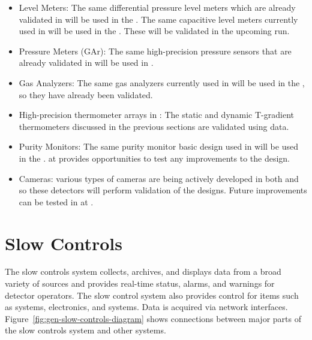 \begin{itemize}
	\item Level Meters: The same differential pressure level meters
	      which are already validated in  will be used in the . The same capacitive level meters currently used in
	       will be used in the . These will be
	      validated in the upcoming  run.
	      
	\item Pressure Meters (GAr): The same high-precision pressure sensors that are already validated in  will be used in  .
	
	\item Gas Analyzers: The same gas analyzers currently used in
	       will be used in the , so they have already
	      been validated.
	      
	\item High-precision thermometer arrays in : The static
	      and dynamic T-gradient thermometers discussed in the previous sections are validated using  data.
	      
	\item Purity Monitors: The same purity monitor basic design used in  will be used in the .  at  provides opportunities to
	      test any improvements to the design.
	\item Cameras: various types of cameras are being actively
	      developed in both  and  so these detectors will perform validation of the 
	      designs. Future
	      improvements can be tested in  at . %
\end{itemize}


\section{Slow Controls}

The slow controls system collects, archives, and displays data from
a broad variety of sources and provides real-time status, alarms, and warnings for detector operators. The slow control system also provides control for %
items such as  systems,  electronics, and  systems. Data is acquired via network interfaces.  Figure~\ref{fig:gen-slow-controls-diagram} shows connections between major parts of the slow controls system and other systems. %

